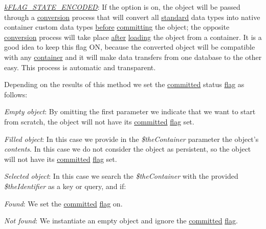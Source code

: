 \begin{DoxyItemize}
\begin{DoxyItemize}
\item {\itshape \hyperlink{}{k\-F\-L\-A\-G\-\_\-\-S\-T\-A\-T\-E\-\_\-\-E\-N\-C\-O\-D\-E\-D}}\-: If the option is on, the object will be passed through a \hyperlink{class_c_container_aa339d3c4c9b011713176a89fe9c7783d}{conversion} process that will convert all \hyperlink{class_c_data_type}{standard} data types into native container custom data types \hyperlink{class_c_container_a0dc47e54abc533cedf1c2c0f915d96b2}{before} \hyperlink{class_c_persistent_object_a88b1f2b11d3d60e0b3d33d8b0649b68a}{committing} the object; the opposite \hyperlink{class_c_data_type_a608d6fc184bce537ce83669f729d6008}{conversion} process will take place \hyperlink{class_c_container_ab53bd683f0e28b2203897cf03f9d1c76}{after} \hyperlink{class_c_persistent_object_a0f0729cfaef48bd1c98c0711c061a7d3}{loading} the object from a container. It is a good idea to keep this flag O\-N, because the converted object will be compatible with any \hyperlink{class_c_container}{container} and it will make data transfers from one database to the other easy. This process is automatic and transparent. 
\end{DoxyItemize}
\end{DoxyItemize}

Depending on the results of this method we set the \hyperlink{class_c_persistent_object_a6520a7bcecf3f39fd61ec6d08f736e77}{committed} status \hyperlink{}{flag} as follows\-:


\begin{DoxyItemize}
\item {\itshape Empty object}\-: By omitting the first parameter we indicate that we want to start from scratch, the object will not have its \hyperlink{class_c_persistent_object_a6520a7bcecf3f39fd61ec6d08f736e77}{committed} \hyperlink{}{flag} set. 
\item {\itshape Filled object}\-: In this case we provide in the {\itshape \$the\-Container} parameter the object's {\itshape contents}. In this case we do not consider the object as persistent, so the object will not have its \hyperlink{class_c_persistent_object_a6520a7bcecf3f39fd61ec6d08f736e77}{committed} \hyperlink{}{flag} set. 
\item {\itshape Selected object}\-: In this case we search the {\itshape \$the\-Container} with the provided {\itshape \$the\-Identifier} as a key or query, and if\-: 
\begin{DoxyItemize}
\item {\itshape Found}\-: We set the \hyperlink{class_c_persistent_object_a6520a7bcecf3f39fd61ec6d08f736e77}{committed} \hyperlink{}{flag} on. 
\item {\itshape Not found}\-: We instantiate an empty object and ignore the \hyperlink{class_c_persistent_object_a6520a7bcecf3f39fd61ec6d08f736e77}{committed} \hyperlink{}{flag}. 
\end{DoxyItemize}
\end{DoxyItemize}


